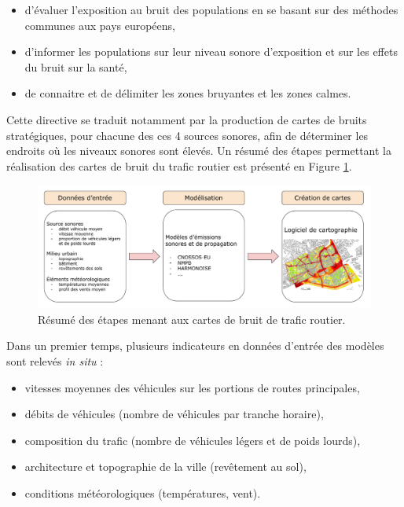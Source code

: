 \begin{itemize}
	\item d'évaluer l'exposition au bruit des populations en se basant sur des méthodes communes aux pays européens,
	\item d'informer les populations sur leur niveau sonore d'exposition et sur les effets du bruit sur la santé,
	\item de connaitre et de délimiter les zones bruyantes et les zones calmes.\\
\end{itemize}

Cette directive se traduit notamment par la production de cartes de bruits stratégiques, pour chacune des ces 4 sources sonores, afin de déterminer les endroits où les niveaux sonores sont élevés. Un résumé des étapes permettant la réalisation des cartes de bruit du trafic routier est présenté en Figure \ref{fig:cartographie}.\\


\begin{figure}[h]
\centering
\includegraphics[width=.85\linewidth]{./figures/cartographie/cartographie.pdf}
\caption{Résumé des étapes menant aux cartes de bruit de trafic routier.}
\label{fig:cartographie}
\end{figure}

Dans un premier temps, plusieurs indicateurs en données d'entrée des modèles sont relevés \textit{in situ} :

\begin{itemize}
\item vitesses moyennes des véhicules sur les portions de routes principales,
\item débits de véhicules (nombre de véhicules par tranche horaire),
\item composition du trafic (nombre de véhicules légers et de poids lourds),
\item architecture et topographie de la ville (revêtement au sol),
\item conditions météorologiques (températures, vent).\\
\end{itemize}

